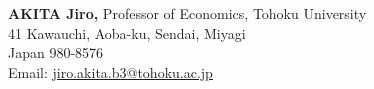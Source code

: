 \documentclass[margin,line]{res}
\begin{document}
\begin{resume}
\par
\parbox{\textwidth}{
{\bf AKITA Jiro,} Professor of Economics, Tohoku University\\
41 Kawauchi, Aoba-ku, Sendai, Miyagi \\
Japan 980-8576 \\
Email: \href{mailto:jiro.akita.b3@tohoku.ac.jp}{jiro.akita.b3@tohoku.ac.jp}}


\end{resume}
\end{document}
